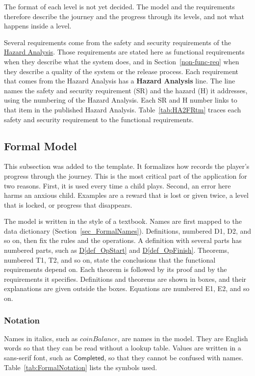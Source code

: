 \documentclass[12pt]{article}
\newcommand{\defref}[1]{\hyperref[#1]{D\ref*{#1}}}
\newcommand{\val}[1]{\ensuremath{\mathsf{#1}}}
\newcommand{\haurl}{https://team-hindsight.github.io/ophthamology-game/HazardAnalysis/HazardAnalysis.pdf}
\newcommand{\hadoc}[1]{\href{\haurl}{#1}}
\begin{document}
The format of each level is not yet decided. The model and the requirements
therefore describe the journey and the progress through its levels, and not
what happens inside a level.

Several requirements come from the safety and security requirements of the
\hadoc{Hazard Analysis}. Those requirements are stated here as functional requirements
when they describe what the system does, and in
Section~\ref{non-func-req} when they describe a quality of the system or the
release process. Each requirement that comes from the Hazard Analysis has a
\textbf{Hazard Analysis} line. The line names the safety and security
requirement (SR) and the hazard (H) it addresses, using the numbering of the
Hazard Analysis. Each SR and H number links to that item in the published
Hazard Analysis. Table~\ref{tab:HA2FRtm} traces each safety and security
requirement to the functional requirements.

\subsection{Formal Model}
\label{sec_FormalSpec}

This subsection was added to the template. It formalizes how \progname{}
records the player's progress through the journey. This is the most critical
part of the application for two reasons. First, it is used every time a child
plays. Second, an error here harms an anxious child. Examples are a reward that
is lost or given twice, a level that is locked, or progress that disappears.

The model is written in the style of a textbook. Names are first mapped to the
data dictionary (Section~\ref{sec_FormalNames}). Definitions, numbered D1, D2,
and so on, then fix the rules and the operations. A definition with several
parts has numbered parts, such as \defref{def_OpStart} and
\defref{def_OpFinish}. Theorems, numbered T1, T2, and so on, state the
conclusions that the functional requirements depend on. Each theorem is
followed by its proof and by the requirements it specifies. Definitions and
theorems are shown in boxes, and their explanations are given outside the
boxes. Equations are numbered E1, E2, and so on.

\subsubsection{Notation}
\label{sec_FormalNotation}

Names in italics, such as $\mathit{coinBalance}$, are names in the model. They
are English words so that they can be read without a lookup table. Values are
written in a sans-serif font, such as \val{Completed}, so that they cannot be
confused with names. Table~\ref{tab:FormalNotation} lists the symbols used.
\end{document}

